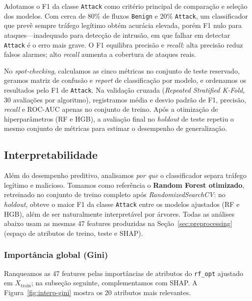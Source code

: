 \documentclass[12pt]{article}
\makeatletter
\newlength{\sbcblockmargin}
\newenvironment{sbcnarrowblock}{%
  \list{}{%
    \topsep\z@
    \partopsep\z@
    \itemsep\z@
    \parsep\z@
    \leftmargin=\sbcblockmargin
    \rightmargin=\sbcblockmargin
    \listparindent=\parindent
    \itemindent=\z@
    \labelwidth=\z@
    \labelsep=\z@
  }\item\relax}
{\endlist}
\makeatother
\begin{document}
\begin{sbcnarrowblock}
Adotamos o F1 da classe \texttt{Attack} como critério principal de comparação e seleção dos modelos.
Com cerca de 80\% de fluxos \texttt{Benign} e 20\% \texttt{Attack}, um classificador que prevê sempre tráfego legítimo obtém acurácia elevada, porém F1 nulo para ataques---inadequado para detecção de intrusão, em que falhar em detectar \texttt{Attack} é o erro mais grave.
O F1 equilibra precisão e \textit{recall}: alta precisão reduz falsos alarmes; alto \textit{recall} aumenta a cobertura de ataques reais.

No \textit{spot-checking}, calculamos as cinco métricas no conjunto de teste reservado, geramos matriz de confusão e \textit{report} de classificação por modelo, e ordenamos os resultados pelo F1 de \texttt{Attack}.
Na validação cruzada (\textit{Repeated Stratified K-Fold}, 30 avaliações por algoritmo), registramos média e desvio padrão de F1, precisão, \textit{recall} e ROC-AUC apenas no conjunto de treino.
Após a otimização de hiperparâmetros (RF e HGB), a avaliação final no \textit{holdout} de teste repetiu o mesmo conjunto de métricas para estimar o desempenho de generalização.

\subsection{Interpretabilidade}
\label{sec:interpretability}

\FloatBarrier

Além do desempenho preditivo, analisamos \textit{por que} o classificador separa tráfego legítimo e malicioso.
Tomamos como referência o \textbf{Random Forest otimizado}, retreinado no conjunto de treino completo após \textit{RandomizedSearchCV}: no \textit{holdout}, obteve o maior F1 da classe \texttt{Attack} entre os modelos ajustados (RF e HGB), além de ser naturalmente interpretável por árvores.
Todas as análises abaixo usam as mesmas 47 features produzidas na Seção~\ref{sec:preprocessing} (espaço de atributos de treino, teste e SHAP).

\subsubsection{Importância global (Gini)}

Ranqueamos as 47 features pelas importâncias de atributos do \texttt{rf\_opt} ajustado em $X_{\mathrm{train}}$; na subseção seguinte, complementamos com SHAP.
A Figura~\ref{fig:interp-gini} mostra os 20 atributos mais relevantes.


\end{sbcnarrowblock}
\end{document}
